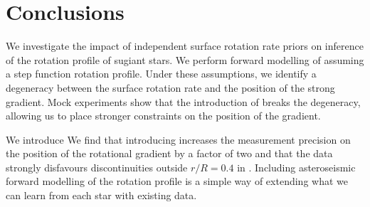 \section{Conclusions}
\label{sec:conclusion}


We investigate the impact of independent surface rotation rate priors on inference of the rotation profile of sugiant stars. We perform forward modelling of assuming a step function rotation profile. Under these assumptions, we identify a degeneracy between the surface rotation rate and the position of the strong gradient. Mock experiments show that the introduction of  breaks the degeneracy, allowing us to place stronger constraints on the position of the gradient.

We introduce 
We find that introducing  increases the measurement precision on the position of the rotational gradient by a factor of two and that the data strongly disfavours discontinuities outside $r/R = 0.4$ in \thestar{}. Including  asteroseismic forward modelling of the rotation profile is a simple way of extending what we can learn from each star with existing data.



